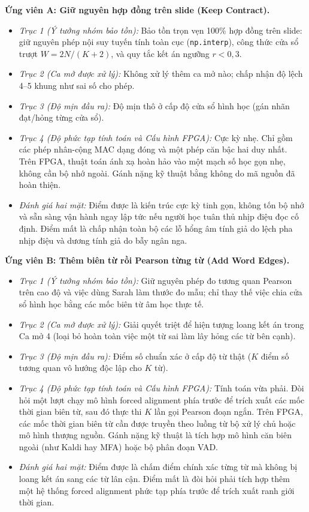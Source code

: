 \documentclass[11pt,a4paper]{article}
\begin{document}
\textbf{Ứng viên A: Giữ nguyên hợp đồng trên slide (Keep Contract).}
\begin{itemize}
    \item \textit{Trục 1 (Ý tưởng nhóm bảo tồn):} Bảo tồn trọn vẹn 100\% hợp đồng trên slide: giữ nguyên phép nội suy tuyến tính toàn cục (\texttt{np.interp}), công thức cửa sổ trượt $W = 2N/(K+2)$, và quy tắc kết án ngưỡng $r < 0{,}3$.
    \item \textit{Trục 2 (Ca mở được xử lý):} Không xử lý thêm ca mở nào; chấp nhận độ lệch 4--5 khung như sai số cho phép.
    \item \textit{Trục 3 (Độ mịn đầu ra):} Độ mịn thô ở cấp độ cửa sổ hình học (gán nhãn đạt/hỏng từng cửa sổ).
    \item \textit{Trục 4 (Độ phức tạp tính toán và Cấu hình FPGA):} Cực kỳ nhẹ. Chỉ gồm các phép nhân-cộng MAC dạng đóng và một phép căn bậc hai duy nhất. Trên FPGA, thuật toán ánh xạ hoàn hảo vào một mạch số học gọn nhẹ, không cần bộ nhớ ngoài. Gánh nặng kỹ thuật bằng không do mã nguồn đã hoàn thiện.
    \item \textit{Đánh giá hai mặt:} Điểm được là kiến trúc cực kỳ tinh gọn, không tốn bộ nhớ và sẵn sàng vận hành ngay lập tức nếu người học tuân thủ nhịp điệu đọc cố định. Điểm mất là chấp nhận toàn bộ các lỗ hổng âm tính giả do lệch pha nhịp điệu và dương tính giả do bẫy ngân nga.
\end{itemize}

\textbf{Ứng viên B: Thêm biên từ rồi Pearson từng từ (Add Word Edges).}
\begin{itemize}
    \item \textit{Trục 1 (Ý tưởng nhóm bảo tồn):} Giữ nguyên phép đo tương quan Pearson trên cao độ và việc dùng Sarah làm thước đo mẫu; chỉ thay thế việc chia cửa sổ hình học bằng các mốc biên từ âm học thực tế.
    \item \textit{Trục 2 (Ca mở được xử lý):} Giải quyết triệt để hiện tượng loang kết án trong Ca mở 4 (loại bỏ hoàn toàn việc một từ sai làm lây hỏng các từ bên cạnh).
    \item \textit{Trục 3 (Độ mịn đầu ra):} Điểm số chuẩn xác ở cấp độ từ thật ($K$ điểm số tương quan vô hướng độc lập cho $K$ từ).
    \item \textit{Trục 4 (Độ phức tạp tính toán và Cấu hình FPGA):} Tính toán vừa phải. Đòi hỏi một lượt chạy mô hình forced alignment phía trước để trích xuất các mốc thời gian biên từ, sau đó thực thi $K$ lần gọi Pearson đoạn ngắn. Trên FPGA, các mốc thời gian biên từ cần được truyền theo luồng từ bộ xử lý chủ hoặc mô hình thượng nguồn. Gánh nặng kỹ thuật là tích hợp mô hình căn biên ngoài (như Kaldi hay MFA) hoặc bộ phân đoạn VAD.
    \item \textit{Đánh giá hai mặt:} Điểm được là chấm điểm chính xác từng từ mà không bị loang kết án sang các từ lân cận. Điểm mất là đòi hỏi phải tích hợp thêm một hệ thống forced alignment phức tạp phía trước để trích xuất ranh giới thời gian.
\end{itemize}
\end{document}

